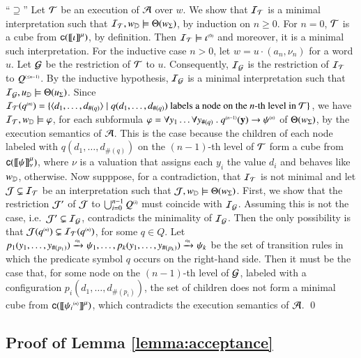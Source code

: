 ``$\supseteq$'' Let $\mathcal{T}$ be an execution of $\mathcal{A}$ over $w$. We show
that $\mathcal{I}_{\mathcal{T}}$ is a minimal interpretation such that $\mathcal{I}_{\mathcal{T}},
{w}_{\mathbb{D}} \models \Theta({{w}_\Sigma})$, by induction on $n \geq
0$. For $n=0$, $\mathcal{T}$ is a cube from $\mathsf{c}({{\bf [\![} \iota {\bf ]\!]}^\mu})$, by
definition. Then $\mathcal{I}_{\mathcal{T}} \models {\iota}^{\scriptscriptstyle{({0})}}$ and moreover, it
is a minimal such interpretation. For the inductive case $n > 0$, let
$w=u\cdot(a_n,\nu_n)$ for a word $u$. Let $\mathcal{G}$ be the restriction of
$\mathcal{T}$ to $u$. Consequently, $\mathcal{I}_{\mathcal{G}}$ is the restriction of $\mathcal{I}_{\mathcal{T}}$ to
${Q}^{\scriptscriptstyle{({\leq n-1})}}$. By the inductive hypothesis, $\mathcal{I}_{\mathcal{G}}$ is a
minimal interpretation such that \(\mathcal{I}_{\mathcal{G}}, u_{\mathbb{D}} \models
\Theta({u_\Sigma})\). Since $\mathcal{I}_{\mathcal{T}}({q}^{\scriptscriptstyle{({n})}}) =
\{ \langle d_1,\ldots,d_{\#(q)} \rangle \mid q(d_1,\ldots,d_{\#(q)}) \text{
    labels a node on the $n$-th level in $\mathcal{T}$} \}$, we have $\mathcal{I}_{\mathcal{T}},
{w}_{\mathbb{D}} \models \varphi$, for each subformula $\varphi = \forall y_1
\ldots \forall y_{\#(q)} ~.~ {q}^{\scriptscriptstyle{({n-1})}}(\mathbf y) \rightarrow
{\psi}^{\scriptscriptstyle{({n})}}$ of $\Theta({{w}_\Sigma})$, by the execution semantics
of $\mathcal{A}$. This is the case because the children of each node labeled
with $q(d_1,\ldots,d_{\#(q)})$ on the $(n-1)$-th level of $\mathcal{T}$ form a
cube from $\mathsf{c}({{\bf [\![} \psi {\bf ]\!]}^\mu_\nu})$, where $\nu$ is a valuation that
assigns each $y_i$ the value $d_i$ and behaves like ${w}_{\mathbb{D}}$,
otherwise. Now supppose, for a contradiction, that $\mathcal{I}_{\mathcal{T}}$ is not
minimal and let $\mathcal{J} \subsetneq \mathcal{I}_{\mathcal{T}}$ be an interpretation such that
$\mathcal{J},{w}_{\mathbb{D}} \models \Theta({{w}_\Sigma})$. First, we show that the
restriction $\mathcal{J}'$ of $\mathcal{J}$ to $\bigcup_{i=0}^{n-1} {Q}^{\scriptscriptstyle{({i})}}$ must
coincide with $\mathcal{I}_{\mathcal{G}}$. Assuming this is not the case, i.e.\ $\mathcal{J}'
\subsetneq \mathcal{I}_{\mathcal{G}}$, contradicts the minimality of $\mathcal{I}_{\mathcal{G}}$. Then the
only possibility is that $\mathcal{J}({q}^{\scriptscriptstyle{({n})}}) \subsetneq
\mathcal{I}_{\mathcal{T}}({q}^{\scriptscriptstyle{({n})}})$, for some $q \in Q$. Let
$p_1(y_1,\ldots,y_{\#(p_1)}) \xrightarrow{{\scriptscriptstyle a_n}}_{{\scriptstyle }} \psi_1, \ldots,
p_k(y_1,\ldots,y_{\#(p_k)}) \xrightarrow{{\scriptscriptstyle a_n}}_{{\scriptstyle }} \psi_k$ be the set of
transition rules in which the predicate symbol $q$ occurs on the
right-hand side. Then it must be the case that, for some node on the
$(n-1)$-th level of $\mathcal{G}$, labeled with a configuration
$p_i(d_1,\ldots,d_{\#(p_i)})$, the set of children does not form a
minimal cube from $\mathsf{c}({{\bf [\![} {\psi_i}^{\scriptscriptstyle{({n})}} {\bf ]\!]}^\mu})$, which
contradicts the execution semantics of $\mathcal{A}$. \qed

\subsection{Proof of Lemma \ref{lemma:acceptance}}

